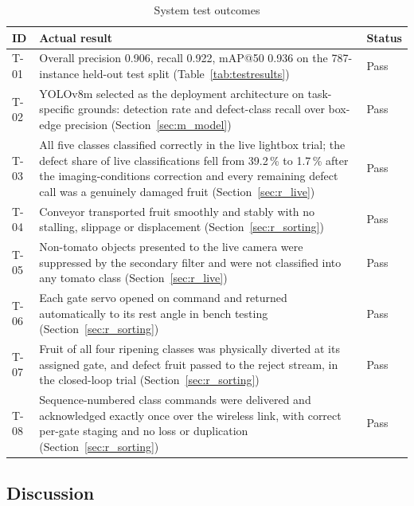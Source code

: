 \begin{table}[H]
\caption{System test outcomes}
\label{tab:testoutcomes}
\centering
\begin{tabularx}{\textwidth}{l X l}
\toprule
\textbf{ID} & \textbf{Actual result} & \textbf{Status} \\
\midrule
T-01 & Overall precision 0.906, recall 0.922, mAP@50 0.936 on the 787-instance held-out test split (Table~\ref{tab:testresults}) & Pass \\
T-02 & YOLOv8m selected as the deployment architecture on task-specific grounds: detection rate and defect-class recall over box-edge precision (Section~\ref{sec:m_model}) & Pass \\
T-03 & All five classes classified correctly in the live lightbox trial; the defect share of live classifications fell from 39.2\,\% to 1.7\,\% after the imaging-conditions correction and every remaining defect call was a genuinely damaged fruit (Section~\ref{sec:r_live}) & Pass \\
T-04 & Conveyor transported fruit smoothly and stably with no stalling, slippage or displacement (Section~\ref{sec:r_sorting}) & Pass \\
T-05 & Non-tomato objects presented to the live camera were suppressed by the secondary filter and were not classified into any tomato class (Section~\ref{sec:r_live}) & Pass \\
T-06 & Each gate servo opened on command and returned automatically to its rest angle in bench testing (Section~\ref{sec:r_sorting}) & Pass \\
T-07 & Fruit of all four ripening classes was physically diverted at its assigned gate, and defect fruit passed to the reject stream, in the closed-loop trial (Section~\ref{sec:r_sorting}) & Pass \\
T-08 & Sequence-numbered class commands were delivered and acknowledged exactly once over the wireless link, with correct per-gate staging and no loss or duplication (Section~\ref{sec:r_sorting}) & Pass \\
\bottomrule
\end{tabularx}
\end{table}

\subsection{Discussion}
\label{sec:r_discussion}

